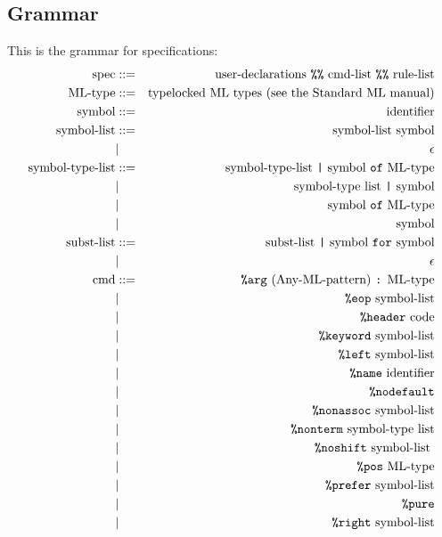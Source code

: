 \subsection{Grammar}

This is the grammar for specifications:
\begin{eqnarray*}
\mbox{spec} & ::= & \mbox{user-declarations {\tt \%\%} cmd-list {\tt \%\%} rule-list} \\
\mbox{ML-type} & ::= & \mbox{typelocked ML types (see the Standard ML manual)} \\
\mbox{symbol} & ::= & \mbox{identifier} \\
\mbox{symbol-list} & ::= & \mbox{symbol-list symbol} \\
              &  | & \epsilon \\
\mbox{symbol-type-list} & ::= & \mbox{symbol-type-list {\tt |} symbol {\tt of} ML-type} \\
                   & | & \mbox{symbol-type list {\tt |} symbol} \\
                   & | & \mbox{symbol {\tt of} ML-type} \\
                   & | & \mbox{symbol} \\
\mbox{subst-list} & ::= & \mbox{subst-list {\tt |} symbol {\tt for} symbol} \\
             &  |  & \epsilon \\
\mbox{cmd} & ::= & \mbox{{\tt \%arg} (Any-ML-pattern) {\tt :} ML-type} \\
 & | & \mbox{{\tt \%eop} symbol-list} \\
 & | & \mbox{{\tt \%header} code} \\
 & | & \mbox{{\tt \%keyword} symbol-list} \\
 & | & \mbox{{\tt \%left} symbol-list} \\
 & | & \mbox{{\tt \%name} identifier} \\
 & | & \mbox{{\tt \%nodefault}} \\
 & | & \mbox{{\tt \%nonassoc} symbol-list} \\
 & | & \mbox{{\tt \%nonterm} symbol-type list} \\
 & | & \mbox{{\tt \%noshift} symbol-list } \\
 & | & \mbox{{\tt \%pos} ML-type} \\
 & | & \mbox{{\tt \%prefer} symbol-list} \\
 & | & \mbox{\tt \%pure} \\
 & | & \mbox{{\tt \%right} symbol-list} \\

\end{eqnarray*}
